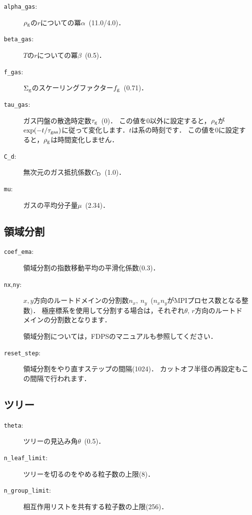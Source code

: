 \documentclass[12pt,a4paper,dvipdfmx]{jsarticle}
\begin{document}
\begin{description}
\item[\texttt{alpha\_gas}:]
$\rho_{\rm g}$の$r$についての冪$\alpha$\ (11.0/4.0)．
\item[\texttt{beta\_gas}:]
$T$の$r$についての冪$\beta$\ (0.5)．
\item[\texttt{f\_gas}:]
$\Sigma_{\rm g}$のスケーリングファクター$f_{\rm g}$\ (0.71)．
\item[\texttt{tau\_gas}:]
ガス円盤の散逸時定数$\tau_{\rm g}$\ (0)．
この値を$0$以外に設定すると，$\rho_{\rm g}$が$\exp(-t/\tau_{\rm gas})$に従って変化します．$t$は系の時刻です．
この値を$0$に設定すると，$\rho_{\rm g}$は時間変化しません．
\item[\texttt{C\_d}:]
無次元のガス抵抗係数$C_{\rm D}$\ (1.0)．
\item[\texttt{mu}:]
ガスの平均分子量$\mu$\ (2.34)．
\end{description}

\subsection{領域分割}
\begin{description}
\item[\texttt{coef\_ema}:]
領域分割の指数移動平均の平滑化係数(0.3)．
\item[\texttt{nx},\texttt{ny}:]
$x,y$方向のルートドメインの分割数$n_{x},\ n_{y}$\ ($n_{x}n_{y}$がMPIプロセス数となる整数)．
極座標系を使用して分割する場合は，それぞれ$\theta,\, r$方向のルートドメインの分割数となります．

領域分割については，FDPSのマニュアルも参照してください．
\item[\texttt{reset\_step}:]
領域分割をやり直すステップの間隔(1024)．%
カットオフ半径の再設定もこの間隔で行われます．
\end{description}

\subsection{ツリー}
\begin{description}
\item[\texttt{theta}:]
ツリーの見込み角$\theta$\ (0.5)．
\item[\texttt{n\_leaf\_limit}:]
ツリーを切るのをやめる粒子数の上限(8)．
\item[\texttt{n\_group\_limit}:]
相互作用リストを共有する粒子数の上限(256)．
\end{description}
\end{document}
